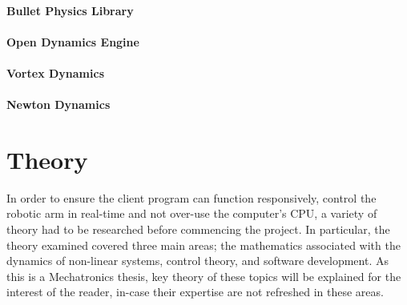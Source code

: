 \documentclass[12pt,openany,a4paper]{book}
\begin{document}
\subsubsection{Bullet Physics Library}

\subsubsection{Open Dynamics Engine}

\subsubsection{Vortex Dynamics}

\subsubsection{Newton Dynamics}



\chapter{Theory}
In order to ensure the client program can function responsively, control the robotic arm in real-time and not over-use the computer's CPU, a variety of theory had to be researched before commencing the project. In particular, the theory examined covered three main areas; the mathematics associated with the dynamics of non-linear systems, control theory, and software development. As this is a Mechatronics thesis, key theory of these topics will be explained for the interest of the reader, in-case their expertise are not refreshed in these areas.
\end{document}
